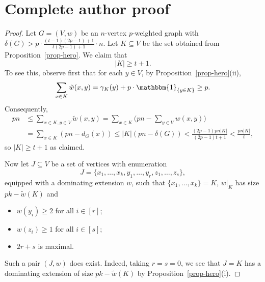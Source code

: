 \documentclass[10pt,a4paper]{amsart}
\newcommand{\cG}{\mathcal{G}}
\begin{document}
\section*{Complete author proof}
\begin{proof}
	Let $G=(V,w)$ be an $n$-vertex $p$-weighted graph with $\delta(G)>p\cdot\frac{(t-1)(2p-1)+1}{t(2p-1)+1}\cdot n$.	%
	Let $K \subseteq V$ be the set obtained from Proposition~\ref{prop-hero}. We claim that
	\begin{equation}\label{eq-K}
		|K|\ge t+1.
	\end{equation}
	To see this, observe first that for each $y\in V$, by Proposition~\ref{prop-hero}(ii), 
	$$\sum_{x \in K}\tilde{w}(x,y)=\gamma_K(y)+p\cdot\mathbbm{1}_{\{y\in K\}}\ge p.$$
	Consequently,
	\begin{align}
		pn &\leq \sum_{x \in K,y \in V}\tilde{w}(x,y) =\sum_{x \in K}\Big(pn-\sum_{y\in V}w(x,y)\Big)\nonumber\\
		&=\sum_{x \in K}(pn-d_G(x)) \leq |K|(pn-\delta(G)) < \frac{(2p-1)pn|K|}{(2p-1)t+1} < \frac{pn|K|}{t},\label{eq:ricecake}
	\end{align}
	so $|K| \geq t+1$ as claimed.
	
	Now let $J \subseteq V$ be a set of vertices with enumeration 
	$$J = \lbrace x_1,\ldots,x_k,y_1,\ldots,y_r,z_1,\ldots,z_s\rbrace,$$
	equipped with a dominating extension $w$, such that $\lbrace x_1,\ldots,x_k\rbrace = K$, $w|_K$ has size $pk-\tilde{w}(K)$ and 
	\begin{itemize}
		\item  $w(y_i) \geq 2$ for all $i \in [r]$;
		\item  $w(z_i) \geq 1$ for all $i \in [s]$;
		\item $2r+s$ is maximal.
	\end{itemize}
	Such a pair $(J,w)$ does exist. Indeed, taking $r=s=0$, we see that $J=K$ has a dominating extension of size $pk-\tilde{w}(K)$ by Proposition~\ref{prop-hero}(i).
	

\end{proof}
\end{document}
